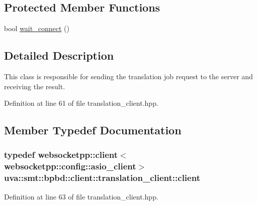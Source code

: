 \subsection*{Protected Member Functions}
\begin{DoxyCompactItemize}
\item 
bool \hyperlink{classuva_1_1smt_1_1bpbd_1_1client_1_1translation__client_aedce4e9a9aae9858530f230d56c2733c}{wait\+\_\+connect} ()
\end{DoxyCompactItemize}


\subsection{Detailed Description}
This class is responsible for sending the translation job request to the server and receiving the result. 

Definition at line 61 of file translation\+\_\+client.\+hpp.



\subsection{Member Typedef Documentation}
\hypertarget{classuva_1_1smt_1_1bpbd_1_1client_1_1translation__client_a390fa2321ff9549e1f31ca2dcbd4a88c}{}
\subsubsection[{client}]{\setlength{\rightskip}{0pt plus 5cm}typedef {\bf websocketpp\+::client}$<${\bf websocketpp\+::config\+::asio\+\_\+client}$>$ {\bf uva\+::smt\+::bpbd\+::client\+::translation\+\_\+client\+::client}}\label{classuva_1_1smt_1_1bpbd_1_1client_1_1translation__client_a390fa2321ff9549e1f31ca2dcbd4a88c}


Definition at line 63 of file translation\+\_\+client.\+hpp.

\hypertarget{classuva_1_1smt_1_1bpbd_1_1client_1_1translation__client_a6bb76738c95be98f5d13370d8e6a1176}{}
